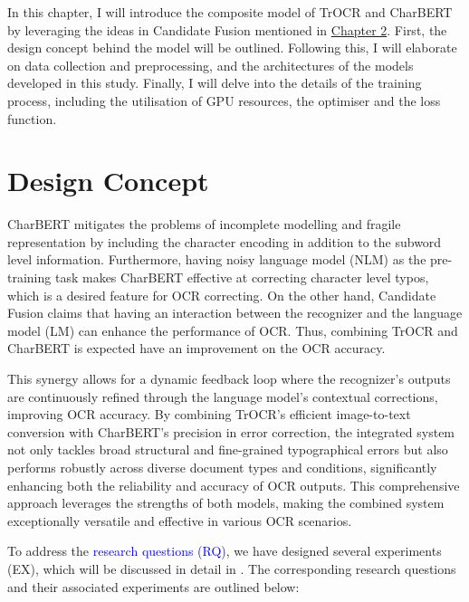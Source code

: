 \label{chap:3_method}
In this chapter, I will introduce the composite model of TrOCR and CharBERT by leveraging the ideas in Candidate Fusion mentioned in \href{chap:2_related_work}{Chapter 2}. First, the design concept behind the model will be outlined. Following this, I will elaborate on data collection and preprocessing, and the architectures of the models developed in this study. Finally, I will delve into the details of the training process, including the utilisation of GPU resources, the optimiser and the loss function.
\section{Design Concept}
\label{sec:3_design_concept}
CharBERT mitigates the problems of incomplete modelling and fragile representation by including the character encoding in addition to the subword level information. Furthermore, having noisy language model (NLM) as the pre-training task makes CharBERT effective at correcting character level typos, which is a desired feature for OCR correcting. On the other hand, Candidate Fusion claims that having an interaction between the recognizer and the language model (LM) can enhance the performance of OCR. Thus, combining TrOCR and CharBERT is expected have an improvement on the OCR accuracy. 

This synergy allows for a dynamic feedback loop where the recognizer's outputs are continuously refined through the language model's contextual corrections, improving OCR accuracy. By combining TrOCR's efficient image-to-text conversion with CharBERT's precision in error correction, the integrated system not only tackles broad structural and fine-grained typographical errors but also performs robustly across diverse document types and conditions, significantly enhancing both the reliability and accuracy of OCR outputs. This comprehensive approach leverages the strengths of both models, making the combined system exceptionally versatile and effective in various OCR scenarios.

To address the \textcolor{Blue}{research questions (RQ)}, we have designed several experiments (EX), which will be discussed in detail in . The corresponding research questions and their associated experiments are outlined below:

